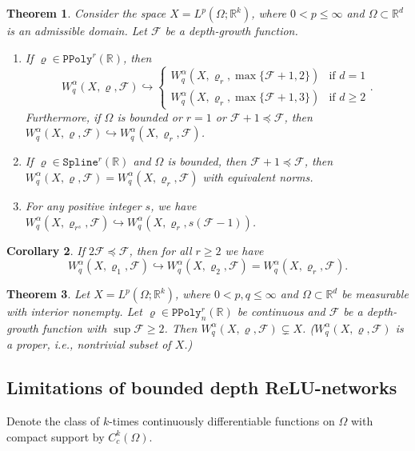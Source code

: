 \documentclass{article}
\newtheorem{theorem}{Theorem}[section]
\newtheorem{corollary}[theorem]{Corollary}
\theoremstyle{definition}
\theoremstyle{remark}
\begin{document}
\begin{theorem}
    Consider the space $X = L^p(\Omega; \mathbb{R}^k)$, where $0 < p \leq \infty$ and $\Omega \subset \mathbb{R}^d$ is an admissible domain. Let $\mathcal{F}$ be a depth-growth function.
    \begin{enumerate}
        \item If $\varrho \in \mathtt{PPoly}^r(\mathbb{R})$, then
        \[W_q^\alpha(X,\varrho,\mathcal{F}) \hookrightarrow
        \begin{cases}
            W_q^\alpha(X,\varrho_r,\max \{ \mathcal{F}+1,2 \}) & \text{if } d = 1 \\
            W_q^\alpha(X,\varrho_r,\max \{ \mathcal{F}+1,3 \}) & \text{if } d \geq 2
        \end{cases}.\]
        Furthermore, if $\Omega$ is bounded or $r = 1$ or $\mathcal{F}+1 \preceq \mathcal{F}$, then $W_q^\alpha(X,\varrho,\mathcal{F}) \hookrightarrow W_q^\alpha(X,\varrho_r,\mathcal{F})$.
        \item If $\varrho \in \mathtt{Spline}^r(\mathbb{R})$ and $\Omega$ is bounded, then $\mathcal{F}+1 \preceq \mathcal{F}$, then $W_q^\alpha(X,\varrho,\mathcal{F}) = W_q^\alpha(X,\varrho_r,\mathcal{F})$ with equivalent norms.
        \item For any positive integer $s$, we have $W_q^\alpha(X,\varrho_{r^s},\mathcal{F}) \hookrightarrow W_q^\alpha(X,\varrho_r,s(\mathcal{F}-1))$.
    \end{enumerate}
\end{theorem}

\begin{corollary}
    If $2\mathcal{F} \preceq \mathcal{F}$, then for all $r \geq 2$ we have
    \[W_q^\alpha(X,\varrho_1,\mathcal{F}) \hookrightarrow W_q^\alpha(X,\varrho_2,\mathcal{F}) = W_q^\alpha(X,\varrho_r,\mathcal{F}).\]
\end{corollary}

\begin{theorem}
    Let $X = L^p(\Omega; \mathbb{R}^k)$, where $0 < p,q \leq \infty$ and $\Omega \subset \mathbb{R}^d$ be measurable with interior nonempty. Let $\varrho \in \mathtt{PPoly}_n^r(\mathbb{R})$ be continuous and $\mathcal{F}$ be a depth-growth function with $\sup \mathcal{F} \geq 2$. Then $W_q^\alpha(X,\varrho,\mathcal{F}) \subsetneq X$. ($W_q^\alpha(X,\varrho,\mathcal{F})$ is a proper, i.e., nontrivial subset of $X$.)
\end{theorem}


\subsection{Limitations of bounded depth ReLU-networks}
Denote the class of $k$-times continuously differentiable functions on $\Omega$ with compact support by $C_c^k(\Omega)$.
\end{document}
